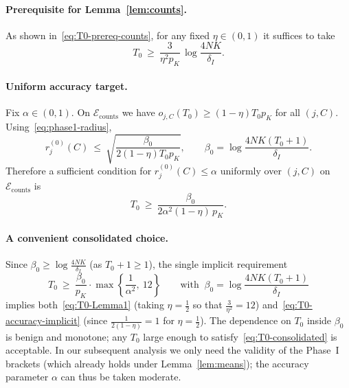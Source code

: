 \paragraph{Prerequisite for Lemma~\ref{lem:counts}.}
As shown in~\eqref{eq:T0-prereq-counts}, for any fixed $\eta\in(0,1)$ it suffices to take
\begin{equation}
\label{eq:T0-Lemma1}
T_0 \ \ge\ \frac{3}{\eta^2 p_K}\,\log\!\frac{4 N K}{\delta_I}.
\end{equation}

\paragraph{Uniform accuracy target.}
Fix $\alpha\in(0,1)$. On $\mathcal E_{\text{counts}}$ we have $o_{j,C}(T_0)\ge (1-\eta)T_0 p_K$ for all $(j,C)$. Using~\eqref{eq:phase1-radius},
\[
r^{(0)}_j(C) \ \le\ \sqrt{\frac{\beta_0}{2(1-\eta)T_0 p_K}},
\qquad \beta_0=\log\!\frac{4NK(T_0+1)}{\delta_I}.
\]
Therefore a sufficient condition for $r^{(0)}_j(C)\le \alpha$ uniformly over $(j,C)$ on $\mathcal E_{\text{counts}}$ is
\begin{equation}
\label{eq:T0-accuracy-implicit}
T_0 \ \ge\ \frac{\beta_0}{2\alpha^2(1-\eta)\,p_K}.
\end{equation}

\paragraph{A convenient consolidated choice.}
Since $\beta_0\ge \log\!\frac{4NK}{\delta_I}$ (as $T_0+1\ge 1$), the single implicit requirement
\begin{equation}
\label{eq:T0-consolidated}
T_0 \ \ge\ \frac{\beta_0}{p_K}\cdot \max\!\left\{ \frac{1}{\alpha^2},\ 12 \right\}
\qquad\text{with }\ \beta_0=\log\!\frac{4 N K (T_0+1)}{\delta_{I}}
\end{equation}
implies both~\eqref{eq:T0-Lemma1} (taking $\eta=\tfrac12$ so that $\tfrac{3}{\eta^2}=12$) and~\eqref{eq:T0-accuracy-implicit} (since $\frac{1}{2(1-\eta)}=1$ for $\eta=\tfrac12$). The dependence on $T_0$ inside $\beta_0$ is benign and monotone; any $T_0$ large enough to satisfy~\eqref{eq:T0-consolidated} is acceptable. In our subsequent analysis we only need the validity of the Phase~I brackets (which already holds under Lemma~\ref{lem:means}); the accuracy parameter $\alpha$ can thus be taken moderate.




\bigskip




